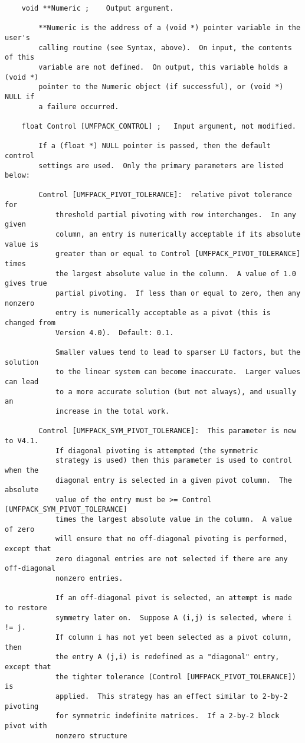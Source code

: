 \documentclass[11pt]{article}
\begin{document}
{\begin{verbatim}
    void **Numeric ;    Output argument.

        **Numeric is the address of a (void *) pointer variable in the user's
        calling routine (see Syntax, above).  On input, the contents of this
        variable are not defined.  On output, this variable holds a (void *)
        pointer to the Numeric object (if successful), or (void *) NULL if
        a failure occurred.

    float Control [UMFPACK_CONTROL] ;   Input argument, not modified.

        If a (float *) NULL pointer is passed, then the default control
        settings are used.  Only the primary parameters are listed below:

        Control [UMFPACK_PIVOT_TOLERANCE]:  relative pivot tolerance for
            threshold partial pivoting with row interchanges.  In any given
            column, an entry is numerically acceptable if its absolute value is
            greater than or equal to Control [UMFPACK_PIVOT_TOLERANCE] times
            the largest absolute value in the column.  A value of 1.0 gives true
            partial pivoting.  If less than or equal to zero, then any nonzero
            entry is numerically acceptable as a pivot (this is changed from
            Version 4.0).  Default: 0.1.

            Smaller values tend to lead to sparser LU factors, but the solution
            to the linear system can become inaccurate.  Larger values can lead
            to a more accurate solution (but not always), and usually an
            increase in the total work.

        Control [UMFPACK_SYM_PIVOT_TOLERANCE]:  This parameter is new to V4.1.
            If diagonal pivoting is attempted (the symmetric
            strategy is used) then this parameter is used to control when the
            diagonal entry is selected in a given pivot column.  The absolute
            value of the entry must be >= Control [UMFPACK_SYM_PIVOT_TOLERANCE]
            times the largest absolute value in the column.  A value of zero
            will ensure that no off-diagonal pivoting is performed, except that
            zero diagonal entries are not selected if there are any off-diagonal
            nonzero entries.

            If an off-diagonal pivot is selected, an attempt is made to restore
            symmetry later on.  Suppose A (i,j) is selected, where i != j.
            If column i has not yet been selected as a pivot column, then
            the entry A (j,i) is redefined as a "diagonal" entry, except that
            the tighter tolerance (Control [UMFPACK_PIVOT_TOLERANCE]) is
            applied.  This strategy has an effect similar to 2-by-2 pivoting
            for symmetric indefinite matrices.  If a 2-by-2 block pivot with
            nonzero structure


\end{verbatim}}
\end{document}
